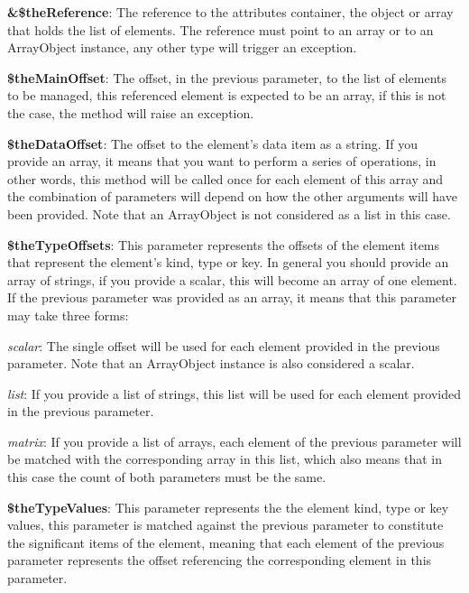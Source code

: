 \begin{DoxyItemize}
\item {\bfseries \&\$the\-Reference}\-: The reference to the attributes container, the object or array that holds the list of elements. The reference must point to an array or to an Array\-Object instance, any other type will trigger an exception. 
\item {\bfseries \$the\-Main\-Offset}\-: The offset, in the previous parameter, to the list of elements to be managed, this referenced element is expected to be an array, if this is not the case, the method will raise an exception. 
\item {\bfseries \$the\-Data\-Offset}\-: The offset to the element's data item as a string. If you provide an array, it means that you want to perform a series of operations, in other words, this method will be called once for each element of this array and the combination of parameters will depend on how the other arguments will have been provided. Note that an Array\-Object is not considered as a list in this case. 
\item {\bfseries \$the\-Type\-Offsets}\-: This parameter represents the offsets of the element items that represent the element's kind, type or key. In general you should provide an array of strings, if you provide a scalar, this will become an array of one element. If the previous parameter was provided as an array, it means that this parameter may take three forms\-: 
\begin{DoxyItemize}
\item {\itshape scalar}\-: The single offset will be used for each element provided in the previous parameter. Note that an Array\-Object instance is also considered a scalar. 
\item {\itshape list}\-: If you provide a list of strings, this list will be used for each element provided in the previous parameter. 
\item {\itshape matrix}\-: If you provide a list of arrays, each element of the previous parameter will be matched with the corresponding array in this list, which also means that in this case the count of both parameters must be the same. 
\end{DoxyItemize}
\item {\bfseries \$the\-Type\-Values}\-: This parameter represents the the element kind, type or key values, this parameter is matched against the previous parameter to constitute the significant items of the element, meaning that each element of the previous parameter represents the offset referencing the corresponding element in this parameter. 

\end{DoxyItemize}
